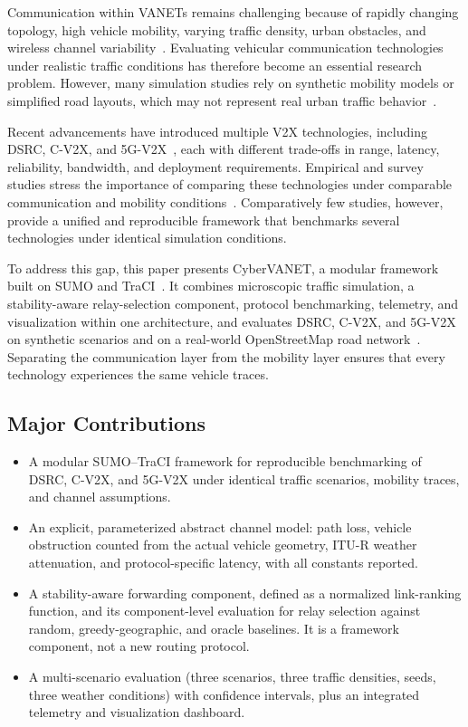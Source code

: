 \documentclass[conference]{IEEEtran}
\begin{document}
Communication within VANETs remains challenging because of rapidly changing topology, high vehicle mobility, varying traffic density, urban obstacles, and wireless channel variability~\cite{souri2024,chatterjee2022}. Evaluating vehicular communication technologies under realistic traffic conditions has therefore become an essential research problem. However, many simulation studies rely on synthetic mobility models or simplified road layouts, which may not represent real urban traffic behavior~\cite{loor2024,morales2024}.

Recent advancements have introduced multiple V2X technologies, including DSRC, C-V2X, and 5G-V2X~\cite{pawar2024,3gpp36885,moradi2023,hwang2023,baccari2025}, each with different trade-offs in range, latency, reliability, bandwidth, and deployment requirements. Empirical and survey studies stress the importance of comparing these technologies under comparable communication and mobility conditions~\cite{souri2024,moradi2023,baccari2025}. Comparatively few studies, however, provide a unified and reproducible framework that benchmarks several technologies under identical simulation conditions.

To address this gap, this paper presents CyberVANET, a modular framework built on SUMO and TraCI~\cite{lopez2018,wegener2008}. It combines microscopic traffic simulation, a stability-aware relay-selection component, protocol benchmarking, telemetry, and visualization within one architecture, and evaluates DSRC, C-V2X, and 5G-V2X on synthetic scenarios and on a real-world OpenStreetMap road network~\cite{osm}. Separating the communication layer from the mobility layer ensures that every technology experiences the same vehicle traces.
 
\subsection{Major Contributions}
\begin{itemize}
\item A modular SUMO--TraCI framework for reproducible benchmarking of DSRC, C-V2X, and 5G-V2X under identical traffic scenarios, mobility traces, and channel assumptions.
\item An explicit, parameterized abstract channel model: path loss, vehicle obstruction counted from the actual vehicle geometry, ITU-R weather attenuation, and protocol-specific latency, with all constants reported.
\item A stability-aware forwarding component, defined as a normalized link-ranking function, and its component-level evaluation for relay selection against random, greedy-geographic, and oracle baselines. It is a framework component, not a new routing protocol.
\item A multi-scenario evaluation (three scenarios, three traffic densities, \nSeeds{} seeds, three weather conditions) with confidence intervals, plus an integrated telemetry and visualization dashboard.
\end{itemize}
 
\end{document}
